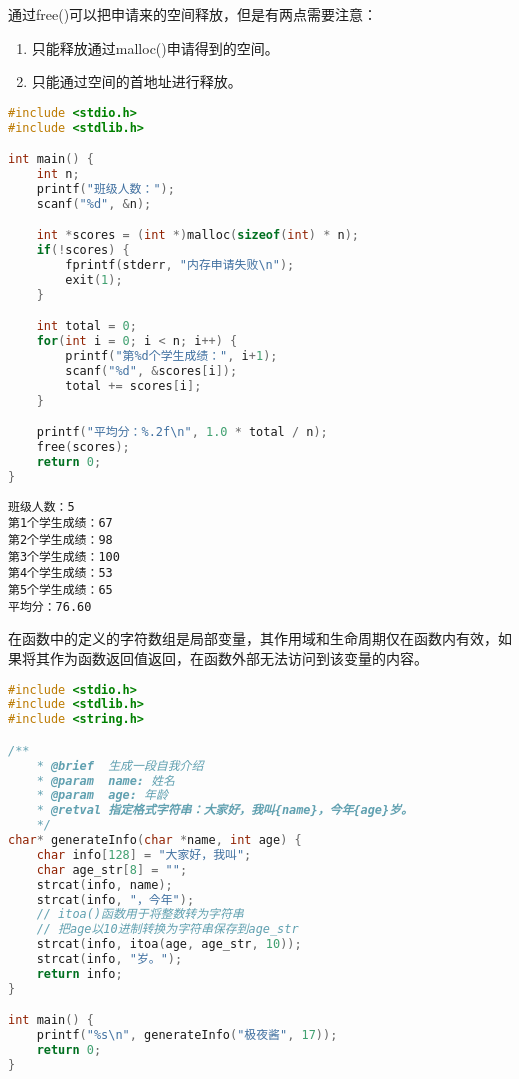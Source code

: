 通过free()可以把申请来的空间释放，但是有两点需要注意：

\begin{enumerate}
    \item 只能释放通过malloc()申请得到的空间。
    \item 只能通过空间的首地址进行释放。
\end{enumerate}

\vspace{0.5cm}


\begin{lstlisting}[language=C]
#include <stdio.h>
#include <stdlib.h>

int main() {
    int n;
    printf("班级人数：");
    scanf("%d", &n);

    int *scores = (int *)malloc(sizeof(int) * n);
    if(!scores) {
        fprintf(stderr, "内存申请失败\n");
        exit(1);
    }

    int total = 0;
    for(int i = 0; i < n; i++) {
        printf("第%d个学生成绩：", i+1);
        scanf("%d", &scores[i]);
        total += scores[i];
    }

    printf("平均分：%.2f\n", 1.0 * total / n);
    free(scores);
    return 0;
}
\end{lstlisting}

\begin{tcolorbox}
    \begin{verbatim}
班级人数：5
第1个学生成绩：67
第2个学生成绩：98
第3个学生成绩：100
第4个学生成绩：53
第5个学生成绩：65
平均分：76.60
	\end{verbatim}
\end{tcolorbox}

在函数中的定义的字符数组是局部变量，其作用域和生命周期仅在函数内有效，如果将其作为函数返回值返回，在函数外部无法访问到该变量的内容。\\


\begin{lstlisting}[language=C]
#include <stdio.h>
#include <stdlib.h>
#include <string.h>

/**
    * @brief  生成一段自我介绍
    * @param  name: 姓名
    * @param  age: 年龄
    * @retval 指定格式字符串：大家好，我叫{name}，今年{age}岁。
    */
char* generateInfo(char *name, int age) {
    char info[128] = "大家好，我叫";
    char age_str[8] = "";
    strcat(info, name);
    strcat(info, "，今年");
    // itoa()函数用于将整数转为字符串
    // 把age以10进制转换为字符串保存到age_str
    strcat(info, itoa(age, age_str, 10));
    strcat(info, "岁。");
    return info;
}

int main() {
    printf("%s\n", generateInfo("极夜酱", 17));
    return 0;
}
\end{lstlisting}

